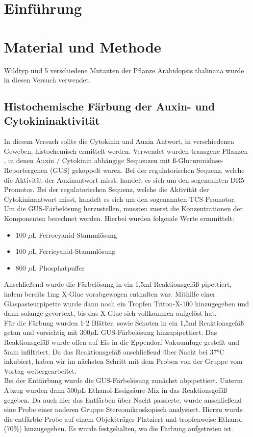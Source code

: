 \documentclass[10pt,a4paper]{article}
\begin{document}
	\tableofcontents
	
	\section{Einführung}	
	
	\section{Material und Methode}
	Wildtyp und 5 verschiedene Mutanten der Pflanze Arabidopsis thalinana wurde in diesen Versuch verwendet.
	\subsection{Histochemische Färbung der Auxin- und Cytokininaktivität}
	In  diesem Versuch sollte die Cytokinin und Auxin Antwort, in verschiedenen Geweben,  histochemisch ermittelt werden. Verwendet wurden transgene Pflanzen , in denen Auxin / Cytokinin abhängige Sequenzen mit ß-Glucuronidase-Reportergenen (GUS) gekoppelt waren. Bei der regulatorischen Sequenz, welche die Aktivität der Auxinantwort misst, handelt es sich um den sogenannten DR5-Promotor. Bei der regulatorischen Sequenz, welche die Aktivität der Cytokininantwort misst, handelt es sich um den sogenannten TCS-Promotor.\\
	Um die GUS-Färbelösung herzustellen, mussten zuerst die Konzentrationen der Komponenten berechnet werden. Hierbei  wurden folgende  Werte ermmittelt:
	\begin{itemize}
		\item 100 $\mu$L Ferrocyanid-Stammlösung
		\item 100 $\mu$L Ferricyanid-Stammlösung
		\item 800 $\mu$L Phosphatpuffer
	\end{itemize}
	Anschließend  wurde  die Färbelösung in ein 1,5ml Reaktionsgefäß pipettiert, indem bereits 1mg  X-Gluc vorabgewogen enthalten war. Mithilfe einer Glaspasteurpipette  wurde dann noch ein Tropfen Triton-X-100 hinzugegeben und dann solange gevortext, bis das X-Gluc sich vollkommen  aufgelöst hat.\\
	Für die Färbung wurden 1-2 Blätter, sowie Schoten in ein 1,5ml Reaktionsgefäß getan und vorsichtig mit 300$\mu$L GUS-Färbelösung hinzupipettiert. Das Reaktionsgefäß wurde offen auf Eis in die  Eppendorf Vakuumfuge gestellt und 5min infiltriert. Da das Reaktionsgefäß anschließend über Nacht bei 37°C inkubiert, haben wir  im nächsten Schritt mit dem Proben  von der Gruppe vom Vortag weitergearbeitet.\\
	Bei der Entfärbung wurde die GUS-Färbelösung zunächst abpipettiert. Unterm Abzug wurden dann 500$\mu$L Ethanol-Essigsäure-Mix in das Reaktionsgefäß gegeben. Da auch hier das Entfärben über Nacht passierte, wurde anschließend eine Probe  einer  anderen  Gruppe Stereomikroskopisch analysiert. Hierzu wurde die entfärbte Probe auf einem Objektträger Platziert und tropfenweise Ethanol (70$\%$) hinzugegeben. Es wurde festgehalten, wo die Färbung aufgetreten ist.
\end{document}
